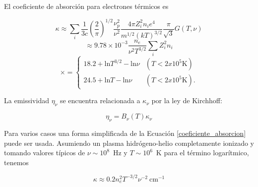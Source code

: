 El coeficiente de absorci\'on para electrones t\'ermicos es

\begin{equation*} \label{coeficiente1}
\kappa \approx \sum_{i} \frac{1}{3c} \left(\frac{2}{\pi}\right)^{1/2} \frac{\nu_p^2}{\nu^2} \frac{4\pi Z_i^2 n_i e^4}{m^{1/2}(kT)^{3/2}} \frac{\pi}{\sqrt{3}}G(T,\nu)
\end{equation*}
\begin{equation*} \label{coeficiente2}
\approx 9.78 \times 10^{-3} \frac{n_e}{\nu^2T^{3/2}} \sum_i Z_i^2 n_i
\end{equation*}
\begin{equation} \label{coeficiente_absorcion}
\times =
    \begin{cases}
    18.2+\mbox{ln} T^{3/2}-\mbox{ln}\nu    & (T < 2 x 10^5 \mbox{K})\\
    24.5+\mbox{ln}T-\mbox{ln}\nu           & (T < 2 x 10^5 \mbox{K}).
    \end{cases}
\end{equation}


La emissividad $\eta_\nu$ se encuentra relacionada a $\kappa_\nu$ por la ley de Kirchhoff:

\begin{equation}
\eta_{\nu}=B_{\nu}(T)\kappa_{\nu}
\end{equation}
 
Para varios casos una forma simplificada de la Ecuaci\'on \ref{coeficiente_absorcion} puede ser usada. Asumiendo un plasma hidr\'ogeno-helio completamente ionizado y tomando valores t\'ipicos de $\nu \sim 10^8$~Hz y $T \sim 10^6$~K para el t\'ermino logar\'itmico, tenemos

\begin{equation} \label{coeficiente_absorcion_simple}
\kappa \approx 0.2 n_e^2T^{-3/2} \nu^{-2}~\mbox{cm}^{-1}
\end{equation}
